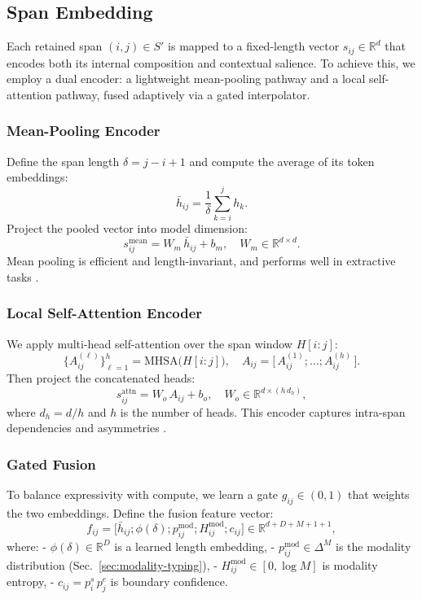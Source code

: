 \subsection{Span Embedding}
\label{sec:span-embedding}

Each retained span \((i,j)\in S'\) is mapped to a fixed-length vector \(s_{ij}\in\mathbb{R}^d\) that encodes both its internal composition and contextual salience. To achieve this, we employ a dual encoder: a lightweight mean-pooling pathway and a local self-attention pathway, fused adaptively via a gated interpolator.

\subsubsection{Mean-Pooling Encoder}

Define the span length \(\delta = j - i + 1\) and compute the average of its token embeddings:
\[
\bar h_{ij} = \frac{1}{\delta} \sum_{k=i}^{j} h_k.
\]
Project the pooled vector into model dimension:
\[
s_{ij}^{\mathrm{mean}} = W_m\,\bar h_{ij} + b_m,
\quad
W_m\in\mathbb{R}^{d\times d}.
\]
Mean pooling is efficient and length-invariant, and performs well in extractive tasks \cite{lee2017end,joshi2020spanbert}.

\subsubsection{Local Self-Attention Encoder}

We apply multi-head self-attention over the span window \(H[i{:}j]\):
\[
\{A_{ij}^{(\ell)}\}_{\ell=1}^h = \mathrm{MHSA}\bigl(H[i{:}j]\bigr),
\quad
A_{ij} = \bigl[\,A_{ij}^{(1)};\dots;A_{ij}^{(h)}\,\bigr].
\]
Then project the concatenated heads:
\[
s_{ij}^{\mathrm{attn}} = W_o\,A_{ij} + b_o,
\quad
W_o\in\mathbb{R}^{d\times(h\,d_h)},
\]
where \(d_h=d/h\) and \(h\) is the number of heads. This encoder captures intra-span dependencies and asymmetries \cite{lee2018higher, tay2021charformer}.

\subsubsection{Gated Fusion}

To balance expressivity with compute, we learn a gate \(g_{ij}\in(0,1)\) that weights the two embeddings. Define the fusion feature vector:
\[
f_{ij} = \bigl[
\bar h_{ij};
\phi(\delta);
p^{\mathrm{mod}}_{ij};
H^{\mathrm{mod}}_{ij};
c_{ij}
\bigr] \in \mathbb{R}^{d + D + M + 1 + 1},
\]
where:
- \(\phi(\delta)\in\mathbb{R}^D\) is a learned length embedding,
- \(p^{\mathrm{mod}}_{ij}\in\Delta^M\) is the modality distribution (Sec.~\ref{sec:modality-typing}),
- \(H^{\mathrm{mod}}_{ij}\in[0,\log M]\) is modality entropy,
- \(c_{ij}=p^s_i\,p^e_j\) is boundary confidence.

